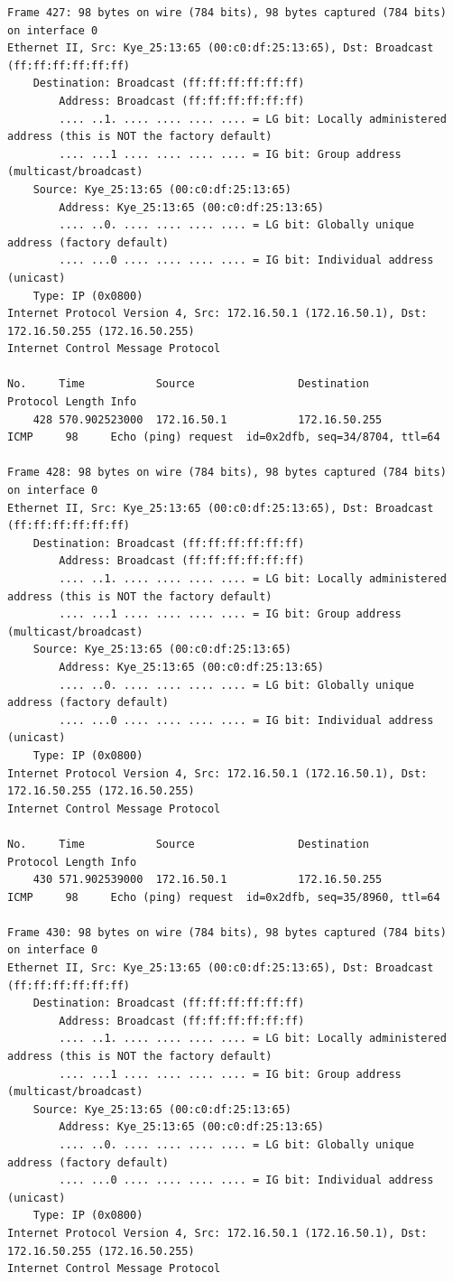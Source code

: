 \documentclass[a4paper,11pt]{article}
\begin{document}
\begin{lstlisting}
Frame 427: 98 bytes on wire (784 bits), 98 bytes captured (784 bits) on interface 0
Ethernet II, Src: Kye_25:13:65 (00:c0:df:25:13:65), Dst: Broadcast (ff:ff:ff:ff:ff:ff)
    Destination: Broadcast (ff:ff:ff:ff:ff:ff)
        Address: Broadcast (ff:ff:ff:ff:ff:ff)
        .... ..1. .... .... .... .... = LG bit: Locally administered address (this is NOT the factory default)
        .... ...1 .... .... .... .... = IG bit: Group address (multicast/broadcast)
    Source: Kye_25:13:65 (00:c0:df:25:13:65)
        Address: Kye_25:13:65 (00:c0:df:25:13:65)
        .... ..0. .... .... .... .... = LG bit: Globally unique address (factory default)
        .... ...0 .... .... .... .... = IG bit: Individual address (unicast)
    Type: IP (0x0800)
Internet Protocol Version 4, Src: 172.16.50.1 (172.16.50.1), Dst: 172.16.50.255 (172.16.50.255)
Internet Control Message Protocol

No.     Time           Source                Destination           Protocol Length Info
    428 570.902523000  172.16.50.1           172.16.50.255         ICMP     98     Echo (ping) request  id=0x2dfb, seq=34/8704, ttl=64

Frame 428: 98 bytes on wire (784 bits), 98 bytes captured (784 bits) on interface 0
Ethernet II, Src: Kye_25:13:65 (00:c0:df:25:13:65), Dst: Broadcast (ff:ff:ff:ff:ff:ff)
    Destination: Broadcast (ff:ff:ff:ff:ff:ff)
        Address: Broadcast (ff:ff:ff:ff:ff:ff)
        .... ..1. .... .... .... .... = LG bit: Locally administered address (this is NOT the factory default)
        .... ...1 .... .... .... .... = IG bit: Group address (multicast/broadcast)
    Source: Kye_25:13:65 (00:c0:df:25:13:65)
        Address: Kye_25:13:65 (00:c0:df:25:13:65)
        .... ..0. .... .... .... .... = LG bit: Globally unique address (factory default)
        .... ...0 .... .... .... .... = IG bit: Individual address (unicast)
    Type: IP (0x0800)
Internet Protocol Version 4, Src: 172.16.50.1 (172.16.50.1), Dst: 172.16.50.255 (172.16.50.255)
Internet Control Message Protocol

No.     Time           Source                Destination           Protocol Length Info
    430 571.902539000  172.16.50.1           172.16.50.255         ICMP     98     Echo (ping) request  id=0x2dfb, seq=35/8960, ttl=64

Frame 430: 98 bytes on wire (784 bits), 98 bytes captured (784 bits) on interface 0
Ethernet II, Src: Kye_25:13:65 (00:c0:df:25:13:65), Dst: Broadcast (ff:ff:ff:ff:ff:ff)
    Destination: Broadcast (ff:ff:ff:ff:ff:ff)
        Address: Broadcast (ff:ff:ff:ff:ff:ff)
        .... ..1. .... .... .... .... = LG bit: Locally administered address (this is NOT the factory default)
        .... ...1 .... .... .... .... = IG bit: Group address (multicast/broadcast)
    Source: Kye_25:13:65 (00:c0:df:25:13:65)
        Address: Kye_25:13:65 (00:c0:df:25:13:65)
        .... ..0. .... .... .... .... = LG bit: Globally unique address (factory default)
        .... ...0 .... .... .... .... = IG bit: Individual address (unicast)
    Type: IP (0x0800)
Internet Protocol Version 4, Src: 172.16.50.1 (172.16.50.1), Dst: 172.16.50.255 (172.16.50.255)
Internet Control Message Protocol


\end{lstlisting}
\end{document}
